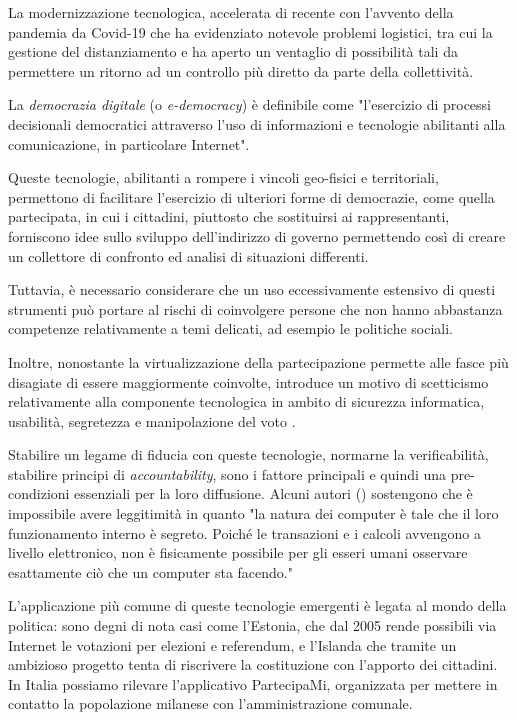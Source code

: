 \documentclass[12pt,a4paper,openright,twoside]{book}
\begin{document}
La modernizzazione tecnologica, accelerata di recente con l'avvento della pandemia da Covid-19 che ha evidenziato notevole problemi
logistici, tra cui la gestione del distanziamento \cite{sotoacosta} e ha aperto un ventaglio di possibilità tali da
permettere un ritorno ad un controllo più diretto da parte della collettività.

La \textit{democrazia digitale} (o \textit{e-democracy}) è definibile come "l'esercizio di processi decisionali democratici attraverso 
l'uso di informazioni e tecnologie abilitanti alla comunicazione, in particolare Internet"\cite{rotzocki}.

Queste tecnologie, abilitanti a rompere i vincoli geo-fisici e territoriali,
permettono di facilitare l'esercizio di ulteriori forme di democrazie,
come quella partecipata, in cui i cittadini, piuttosto che
sostituirsi ai rappresentanti, forniscono idee sullo sviluppo dell'indirizzo di governo
permettendo così di creare un collettore di confronto ed analisi di situazioni differenti.

Tuttavia, è necessario considerare che un uso eccessivamente estensivo di questi strumenti
può portare al rischi di coinvolgere persone che non hanno abbastanza competenze relativamente 
a temi delicati, ad esempio le politiche sociali. 

Inoltre, nonostante la virtualizzazione della partecipazione permette alle fasce più disagiate di essere
maggiormente coinvolte, introduce un motivo di scetticismo relativamente alla componente tecnologica
in ambito di sicurezza informatica, usabilità, segretezza e manipolazione del voto \cite{aichholzer2020experience}.

Stabilire un legame di fiducia con queste tecnologie, normarne la verificabilità, stabilire principi di 
\textit{accountability}, sono i fattore principali e quindi una pre-condizioni essenziali
per la loro diffusione. 
Alcuni autori (\cite{mcgaley}) sostengono che è impossibile avere leggitimità in quanto "la natura dei computer è tale che il loro funzionamento interno è segreto.
Poiché le transazioni e i calcoli avvengono a livello elettronico, 
non è fisicamente possibile per gli esseri umani osservare esattamente ciò che un computer sta facendo."

L'applicazione più comune di queste tecnologie emergenti è legata al mondo della politica\cite{aichholzer2020experience}:
sono degni di nota casi come l'Estonia, che dal 2005 rende possibili via Internet le votazioni
per elezioni e referendum, e l'Islanda che tramite un ambizioso progetto tenta di riscrivere %
la costituzione con l'apporto dei cittadini. In Italia possiamo rilevare l'applicativo PartecipaMi,
organizzata per mettere in contatto la popolazione milanese con l'amministrazione comunale.\cite{WebsitePartecipaMi}
\end{document}
